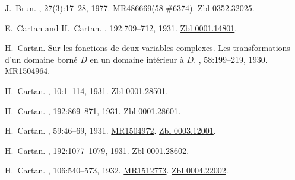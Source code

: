 \documentclass[11pt,a4paper, final, twoside]{article}
\numberwithin{equation}{section}
\begin{document}
\begin{appendices}
\begin{thebibliography}{100}
J.~Brun.
, 27(3):17--28, 1977.
\newblock \href{http://www.ams.org/mathscinet-getitem?mr=486669}{MR486669}(58
  \#6374). \href{http://zbmath.org/?q=an:0352.32025}{Zbl 0352.32025}.

E.~Cartan and H.~Cartan.
, 192:709--712, 1931.
\newblock \href{http://zbmath.org/?q=an:0001.14801}{Zbl 0001.14801}.

H.~Cartan.
\newblock Sur les fonctions de deux variables complexes. {L}es transformations
  d'un domaine born\'e {$D$} en un domaine int\'erieur \`a {$D$}.
,
  58:199--219, 1930.
\newblock \href{http://www.ams.org/mathscinet-getitem?mr=1504964}{MR1504964}.

H.~Cartan.
, 10:1--114, 1931.
\newblock \href{http://zbmath.org/?q=an:0001.28501}{Zbl 0001.28501}.

H.~Cartan.
, 192:869--871, 1931.
\newblock \href{http://zbmath.org/?q=an:0001.28601}{Zbl 0001.28601}.

H.~Cartan.
,
  59:46--69, 1931.
\newblock \href{http://www.ams.org/mathscinet-getitem?mr=1504972}{MR1504972}.
  \href{http://zbmath.org/?q=an:0003.12001}{Zbl 0003.12001}.

H.~Cartan.
, 192:1077--1079, 1931.
\newblock \href{http://zbmath.org/?q=an:0001.28602}{Zbl 0001.28602}.

H.~Cartan.
, 106:540--573, 1932.
\newblock \href{http://www.ams.org/mathscinet-getitem?mr=1512773}{MR1512773}.
  \href{http://zbmath.org/?q=an:0004.22002}{Zbl 0004.22002}.


\end{thebibliography}
\end{appendices}
\end{document}
